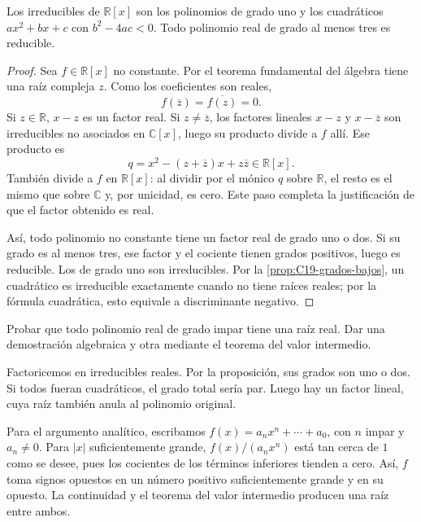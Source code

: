 \begin{prop}\label{prop:C19-reales}
Los irreducibles de $\mathbb R[x]$ son los polinomios de grado uno y los cuadráticos $ax^2+bx+c$ con $b^2-4ac<0$. Todo polinomio real de grado al menos tres es reducible.
\end{prop}
\begin{proof}
Sea $f\in\mathbb R[x]$ no constante. Por el teorema fundamental del álgebra tiene una raíz compleja $z$. Como los coeficientes son reales,
\[
f(\overline z)=\overline{f(z)}=0.
\]
Si $z\in\mathbb R$, $x-z$ es un factor real. Si $z\ne\overline z$, los factores lineales $x-z$ y $x-\overline z$ son irreducibles no asociados en $\mathbb C[x]$, luego su producto divide a $f$ allí. Ese producto es
\[
q=x^2-(z+\overline z)x+z\overline z\in\mathbb R[x].
\]
También divide a $f$ en $\mathbb R[x]$: al dividir por el mónico $q$ sobre $\mathbb R$, el resto es el mismo que sobre $\mathbb C$ y, por unicidad, es cero. Este paso completa la justificación de que el factor obtenido es real.

Así, todo polinomio no constante tiene un factor real de grado uno o dos. Si su grado es al menos tres, ese factor y el cociente tienen grados positivos, luego es reducible. Los de grado uno son irreducibles. Por la \cref{prop:C19-grados-bajos}, un cuadrático es irreducible exactamente cuando no tiene raíces reales; por la fórmula cuadrática, esto equivale a discriminante negativo.
\end{proof}

\begin{ejer}\label{ejer:C19-impar}
Probar que todo polinomio real de grado impar tiene una raíz real. Dar una demostración algebraica y otra mediante el teorema del valor intermedio.
\end{ejer}
\begin{sol}
Factoricemos en irreducibles reales. Por la proposición, sus grados son uno o dos. Si todos fueran cuadráticos, el grado total sería par. Luego hay un factor lineal, cuya raíz también anula al polinomio original.

Para el argumento analítico, escribamos $f(x)=a_nx^n+\cdots+a_0$, con $n$ impar y $a_n\ne0$. Para $|x|$ suficientemente grande, $f(x)/(a_nx^n)$ está tan cerca de $1$ como se desee, pues los cocientes de los términos inferiores tienden a cero. Así, $f$ toma signos opuestos en un número positivo suficientemente grande y en su opuesto. La continuidad y el teorema del valor intermedio producen una raíz entre ambos.
\end{sol}


